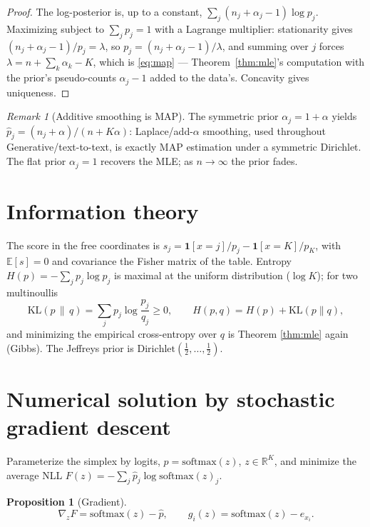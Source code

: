 \documentclass[11pt]{article}
\newtheorem{proposition}{Proposition}
\theoremstyle{remark}
\newtheorem{remark}{Remark}
\newcommand{\E}{\mathbb{E}}
\begin{document}
\begin{proof}
The log-posterior is, up to a constant,
$\sum_j (n_j + \alpha_j - 1)\log p_j$. Maximizing subject to
$\sum_j p_j = 1$ with a Lagrange multiplier: stationarity gives
$(n_j + \alpha_j - 1)/p_j = \lambda$, so
$p_j = (n_j + \alpha_j - 1)/\lambda$, and summing over $j$ forces
$\lambda = n + \sum_k \alpha_k - K$, which is \eqref{eq:map} ---
Theorem~\ref{thm:mle}'s computation with the prior's pseudo-counts
$\alpha_j - 1$ added to the data's. Concavity gives uniqueness.
\end{proof}

\begin{remark}[Additive smoothing is MAP]
The symmetric prior $\alpha_j = 1 + \alpha$ yields
$\hat p_j = (n_j + \alpha)/(n + K\alpha)$: Laplace/add-$\alpha$
smoothing, used throughout Generative/text-to-text, is exactly MAP
estimation under a symmetric Dirichlet. The flat prior
$\alpha_j = 1$ recovers the MLE; as $n \to \infty$ the prior fades.
\end{remark}

\section{Information theory}

The score in the free coordinates is
$s_j = \mathbf{1}[x{=}j]/p_j - \mathbf{1}[x{=}K]/p_K$, with
$\E[s] = 0$ and covariance the Fisher matrix of the table. Entropy
$H(p) = -\sum_j p_j \log p_j$ is maximal at the uniform distribution
($\log K$); for two multinoullis
\begin{equation}
  \mathrm{KL}(p \,\|\, q) = \sum_j p_j \log\frac{p_j}{q_j} \ge 0,
  \qquad
  H(p, q) = H(p) + \mathrm{KL}(p \| q),
  \label{eq:kl}
\end{equation}
and minimizing the empirical cross-entropy over $q$ is Theorem
\ref{thm:mle} again (Gibbs). The Jeffreys prior is
$\mathrm{Dirichlet}(\tfrac12, \dots, \tfrac12)$.

\section{Numerical solution by stochastic gradient descent}

Parameterize the simplex by logits, $p = \mathrm{softmax}(z)$,
$z \in \mathbb{R}^K$, and minimize the average NLL
$F(z) = -\sum_j \hat p_j \log \mathrm{softmax}(z)_j$.

\begin{proposition}[Gradient]
\begin{equation}
  \boxed{\;\nabla_z F = \mathrm{softmax}(z) - \hat p,
  \qquad
  g_i(z) = \mathrm{softmax}(z) - e_{x_i}.\;}
  \label{eq:grad}
\end{equation}
\end{proposition}
\end{document}
